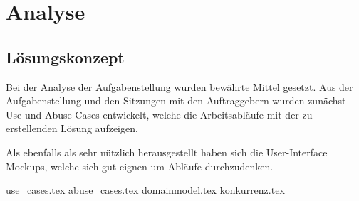 \chapter{Analyse}
\section{Lösungskonzept}

Bei der Analyse der Aufgabenstellung wurden bewährte Mittel gesetzt. Aus der Aufgabenstellung und den Sitzungen mit den Auftraggebern wurden zunächst Use und Abuse Cases entwickelt, welche die Arbeitsabläufe mit der zu erstellenden Lösung aufzeigen.

Als ebenfalls als sehr nützlich herausgestellt haben sich die User-Interface Mockups, welche sich gut eignen um Abläufe durchzudenken.


\clearpage
{use_cases.tex}
\clearpage
{abuse_cases.tex}
\clearpage
{domainmodel.tex}
\clearpage
{konkurrenz.tex}

